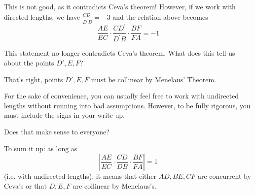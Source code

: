 This is not good, as it contradicts Ceva's theorem! However, if we work with directed lengths, we have $\frac{CD^\prime}{D^\prime B}=-3$ and the relation above becomes $$\frac{AE}{EC}\cdot \frac{CD^\prime}{D^\prime B}\cdot \frac{BF}{FA} = -1$$

This statement no longer contradicts Ceva's theorem. What does this tell us about the points $D',E,F$?









That's right, points $D',E,F$ must be collinear by Menelaus' Theorem.

For the sake of convenience, you can usually feel free to work with undirected lengths without running into bad assumptions. However, to be fully rigorous, you must include the signs in your write-up.

Does that make sense to everyone?






To sum it up: as long as $$\left | \frac{AE}{EC}\cdot \frac{CD}{DB}\cdot \frac{BF}{FA}\right | = 1$$ (i.e. with undirected lengths), it means that either $AD, BE, CF$ are concurrent by Ceva's or that $D, E, F$ are collinear by Menelaus's.

